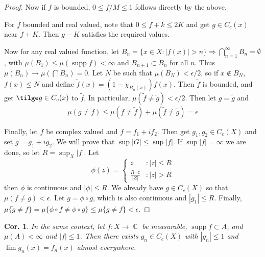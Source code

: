 \documentclass[12pt, a4paper]{book}
\DeclareMathOperator{\C}{\mathbb{C}}
\DeclareMathOperator{\supp}{supp}
\newtheorem{corollary}[theorem]{Cor.}
\theoremstyle{nonumberplain}
\newtheorem{proof}{Proof}
\begin{document}
\begin{proof}
    Now if $f$ is bounded, $0\leq f/M\leq 1$ follows directly by the above.

    For $f$ bounded and real valued, note that $0\leq f+k\leq 2K$ and get $g\in C_c(x)$ near $f+K$.
    Then $g-K$ satisfies the required values.

    Now for any real valued function, let $B_n=\{x\in X:|f(x)|>n\}\Rightarrow\bigcap\limits_{n=1}^\infty B_n=\emptyset$, with $\mu(B_1)\leq\mu(\supp f)<\infty$ and $B_{n+1}\subset B_n$ for all $n$.
    Thus $\mu(B_n)\to\mu(\bigcap B_n)=0$.
    Let $N$ be such that $\mu(B_N)<\epsilon/2$, so if $x\notin B_N$, $f(x)\leq N$ and define $\tilde f(x)=(1-\chi_{B_n(x)})f(x)$.
    Then $\tilde f$ is bounded, and get $\tilge g\in C_c(x)$ to $\tilde f$.
    In particular, $\mu(\tilde f\neq\tilde g)<\epsilon/2$.
    Then let $g=\tilde g$ and
    \[\mu(g\neq f)\leq\mu(f\neq \tilde f)+\mu(\tilde f\neq\tilde g)=\epsilon\]

    Finally, let $f$ be complex valued and $f=f_1+if_2$.
    Then get $g_1,g_2\in C_c(X)$ and set $g=g_1+ig_2$.
    We will prove that $\sup|G|\leq\sup|f|$.
    If $\sup|f|=\infty$ we are done, so let $R=\sup_X|f|$.
    Let
    \[\phi(z)=
        \begin{cases}
            z &:|z|\leq R\\
            \frac{R\cdot z}{|Z|}&: |z|>R
        \end{cases}
    \]
    then $\phi$ is continuous and $|\phi|\leq R$.
    We already have $g\in C_c(X)$ so that $\mu(f\neq g)<\epsilon$.
    Let $\tilde g=\phi\circ g$, which is also continuous and $|g_1|\leq R$.
    Finally, $\mu\{\tilde g\neq f\}=\mu\{\phi\circ f\neq\phi\circ g\}\leq\mu\{g\neq f\}<\epsilon$.
\end{proof}
\begin{corollary}
    In the same context, let $f:X\to\C$ be measurable, $\supp f\subset A$, and $\mu(A)<\infty$ and $|f|\leq 1$.
    Then there exists $g_n\in C_c(X)$ with $|g_n|\leq 1$ and $\lim g_n(x)=f_n(x)$ almost everywhere.
\end{corollary}
\end{document}
